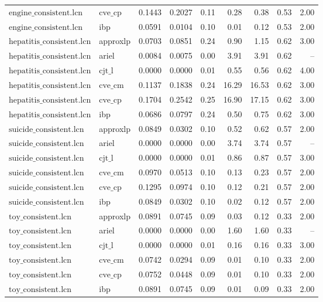 \begin{table}[ht]
\begin{tabular}{llrrrrrrr}
$\text{engine\_consistent.lcn}$ & $\text{cve\_cp}$ & 0.1443 & 0.2027 & 0.11 & 0.28 & 0.38 & 0.53 & 2.00 \\
$\text{engine\_consistent.lcn}$ & ibp & 0.0591 & 0.0104 & 0.10 & 0.01 & 0.12 & 0.53 & 2.00 \\
$\text{hepatitis\_consistent.lcn}$ & approxlp & 0.0703 & 0.0851 & 0.24 & 0.90 & 1.15 & 0.62 & 3.00 \\
$\text{hepatitis\_consistent.lcn}$ & ariel & 0.0084 & 0.0075 & 0.00 & 3.91 & 3.91 & 0.62 & -- \\
$\text{hepatitis\_consistent.lcn}$ & $\text{cjt\_l}$ & 0.0000 & 0.0000 & 0.01 & 0.55 & 0.56 & 0.62 & 4.00 \\
$\text{hepatitis\_consistent.lcn}$ & $\text{cve\_cm}$ & 0.1137 & 0.1838 & 0.24 & 16.29 & 16.53 & 0.62 & 3.00 \\
$\text{hepatitis\_consistent.lcn}$ & $\text{cve\_cp}$ & 0.1704 & 0.2542 & 0.25 & 16.90 & 17.15 & 0.62 & 3.00 \\
$\text{hepatitis\_consistent.lcn}$ & ibp & 0.0686 & 0.0797 & 0.24 & 0.50 & 0.75 & 0.62 & 3.00 \\
$\text{suicide\_consistent.lcn}$ & approxlp & 0.0849 & 0.0302 & 0.10 & 0.52 & 0.62 & 0.57 & 2.00 \\
$\text{suicide\_consistent.lcn}$ & ariel & 0.0000 & 0.0000 & 0.00 & 3.74 & 3.74 & 0.57 & -- \\
$\text{suicide\_consistent.lcn}$ & $\text{cjt\_l}$ & 0.0000 & 0.0000 & 0.01 & 0.86 & 0.87 & 0.57 & 3.00 \\
$\text{suicide\_consistent.lcn}$ & $\text{cve\_cm}$ & 0.0970 & 0.0513 & 0.10 & 0.13 & 0.23 & 0.57 & 2.00 \\
$\text{suicide\_consistent.lcn}$ & $\text{cve\_cp}$ & 0.1295 & 0.0974 & 0.10 & 0.12 & 0.21 & 0.57 & 2.00 \\
$\text{suicide\_consistent.lcn}$ & ibp & 0.0849 & 0.0302 & 0.10 & 0.02 & 0.12 & 0.57 & 2.00 \\
$\text{toy\_consistent.lcn}$ & approxlp & 0.0891 & 0.0745 & 0.09 & 0.03 & 0.12 & 0.33 & 2.00 \\
$\text{toy\_consistent.lcn}$ & ariel & 0.0000 & 0.0000 & 0.00 & 1.60 & 1.60 & 0.33 & -- \\
$\text{toy\_consistent.lcn}$ & $\text{cjt\_l}$ & 0.0000 & 0.0000 & 0.01 & 0.16 & 0.16 & 0.33 & 3.00 \\
$\text{toy\_consistent.lcn}$ & $\text{cve\_cm}$ & 0.0742 & 0.0294 & 0.09 & 0.01 & 0.10 & 0.33 & 2.00 \\
$\text{toy\_consistent.lcn}$ & $\text{cve\_cp}$ & 0.0752 & 0.0448 & 0.09 & 0.01 & 0.10 & 0.33 & 2.00 \\
$\text{toy\_consistent.lcn}$ & ibp & 0.0891 & 0.0745 & 0.09 & 0.01 & 0.09 & 0.33 & 2.00 \\
\bottomrule
\end{tabular}
\end{table}
